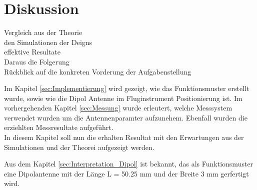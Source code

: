\chapter{Diskussion}
Vergleich aus der Theorie\\
den Simulationen der Deigns\\
effektive Resultate\\

Daraus die Folgerung\\

Rückblick auf die konkreten Vorderung der Aufgabenstellung

Im Kapitel \ref{sec:Implementierung} wird gezeigt, wie das Funktionsmuster erstellt wurde, sowie wie die Dipol Antenne  im Fluginstrument Positionierung ist. Im vorhergehenden Kapitel \ref{sec:Messung} wurde erleutert, welche Messsystem verwendet wurden um die Antennenparamter aufzunehem. Ebenfall wurden die erziehlten Messresultate aufgeführt.\\
In diesem Kapitel soll nun die erhalten Resultat mit den Erwartungen aus der Simulationen und der Theorei aufgezeigt werden.

Aus dem Kapitel \ref{sec:Interpretation_Dipol} ist bekannt, das als Funktionsmuster eine Dipolantenne mit der Länge L = 50.25 mm und der Breite 3 mm gerfertigt wird. 

